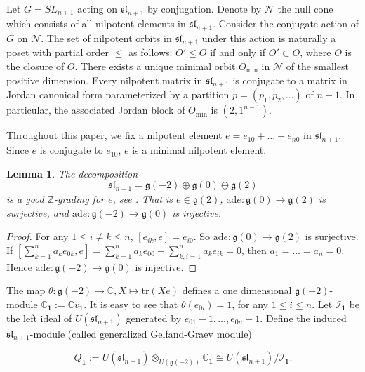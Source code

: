 \documentclass[12pt,a4paper]{amsart}
\newtheorem{lemma}[theorem]{Lemma}%
\numberwithin{equation}{section}
\newcommand{\C}{\mathbb C}
\newcommand{\Z}{\mathbb{Z}}
\def\mg{\mathfrak{g}}
\def\sl{\mathfrak{sl}}
\def\b1{\mathbf{1}}
\begin{document}
 Let $G=SL_{n+1}$ acting on $\sl_{n+1}$ by conjugation.
 Denote by  $\mathcal{N}$ the null cone which consists of all nilpotent elements in $\sl_{n+1}$. Consider the conjugate action of $G$ on $\mathcal{N}$. The set of nilpotent orbits in $\sl_{n+1}$ under this action is naturally a poset with partial order $\leq$ as follows: $O'\leq O$ if and only if $O'\subset \overline{O}$,
 where $\overline{O}$ is the closure of $O$.
 There exists a unique
minimal orbit $O_{\text{min}}$ in $\mathcal{N}$ of the smallest positive dimension.
 Every nilpotent matrix in $\sl_{n+1}$
is conjugate to a matrix in
Jordan canonical form parameterized
by a partition $p= (p_1,p_2,\dots)$ of $n+1$. In particular,
the associated Jordan block of $O_{\text{min}}$ is $(2,1^{n-1})$.

Throughout this paper, we fix a nilpotent element  $e=e_{10}+\dots+e_{n0}$ in
$\sl_{n+1}$.  Since $e$ is conjugate to $e_{10}$, $e$ is a  minimal nilpotent element.


\begin{lemma}The decomposition
$$\sl_{n+1}=\mg(-2)\oplus\mg(0)\oplus \mg(2)$$ is a good $\Z$-grading
for $e$,  see \cite{EK}. That is $e\in \mg(2)$,
$\text{ad}e: \mg(0)\rightarrow\mg(2)$ is surjective, and $\text{ad}e: \mg(-2)\rightarrow\mg(0)$ is injective.
\end{lemma}

\begin{proof} For any $1\leq i\neq k\leq n$,  $[e_{ik}, e]=e_{i0}$. So $\text{ad}e: \mg(0)\rightarrow\mg(2)$ is surjective.
If $[\sum_{k=1}^n a_{k}e_{0k}, e]=\sum_{k=1}^n a_{k}e_{00}-\sum_{k,i=1}^na_{k}e_{ik}=0$, then $a_1=\dots=a_n=0$. Hence $\text{ad}e: \mg(-2)\rightarrow\mg(0)$ is injective.
\end{proof}

The map $\theta:\mg(-2) \rightarrow \C, X\mapsto \text{tr}(Xe)$ defines a one dimensional
$\mg(-2) $-module $\C_{\b1}:=\C v_{\b1}$. It is easy to see that $\theta(e_{0i})=1$,  for any $1\leq i \leq n$. Let
$\mathcal{I}_{\b1}$ be the left ideal of $U(\sl_{n+1}) $ generated by
$e_{01}-1,\dots,e_{0n}-1$.
Define  the induced $\sl_{n+1}$-module
(called generalized Gelfand-Graev module)

\begin{equation}\label{qmod}Q_{\b1} := U(\sl_{n+1}) \otimes_{U(\mg(-2) )}\C_{\b1}\cong U(\sl_{n+1})/\mathcal{I}_{\b1}.\end{equation}
\end{document}
